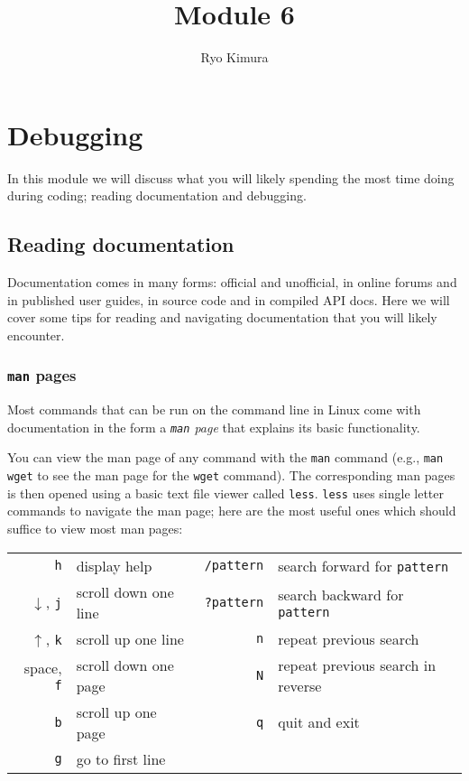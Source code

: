 \documentclass[12pt]{article}
\begin{document}
\title{Module 6}
\author{Ryo Kimura}
\date{}
\maketitle

\setcounter{section}{5}
\section{Debugging}
In this module we will discuss what you will likely spending the most time doing during coding; reading documentation and debugging.

\subsection{Reading documentation}
Documentation comes in many forms: official and unofficial, in online forums and in published user guides, in source code and in compiled API docs. Here we will cover some tips for reading and navigating documentation that you will likely encounter.
\subsubsection{\texttt{man} pages}
Most commands that can be run on the command line in Linux come with documentation in the form a \emph{\texttt{man} page} that explains its basic functionality.

You can view the man page of any command with the \texttt{man} command (e.g., \texttt{man wget} to see the man page for the \texttt{wget} command).  The corresponding man pages is then opened using a basic text file viewer called \texttt{less}.  \texttt{less} uses single letter commands to navigate the man page; here are the most useful ones which should suffice to view most man pages:
\begin{table}[!h]
\begin{center}
    \begin{tabular}{|r|l||r|l|}
        \hline 
        \texttt{h} & display help  & \texttt{/pattern} & search forward for \texttt{pattern} \\
        $\downarrow$, \texttt{j} & scroll down one line & \texttt{?pattern} & search backward for \texttt{pattern} \\
        $\uparrow$, \texttt{k} & scroll up one line & \texttt{n} & repeat previous search \\
        space, \texttt{f} & scroll down one page & \texttt{N} & repeat previous search in reverse \\
        \texttt{b} & scroll up one page & \texttt{q} & quit and exit \\
        \texttt{g} & go to first line & & \\
        \hline
    \end{tabular}
\end{center}
\end{table}
\end{document}
